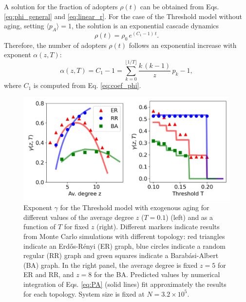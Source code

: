 A solution for the fraction of adopters $\rho(t)$ can be obtained from  Eqs. \eqref{eq:phi_general} and \eqref{eq:linear_r}.  For the case of the Threshold model without aging, setting $\langle p_A \rangle = 1$,  the solution is an exponential cascade dynamics
\begin{equation}
    \rho(t) = \rho_0 \, e^{(C_1 - 1)\, t}.
\end{equation}
Therefore, the number of adopters $\rho (t)$ follows an exponential increase with exponent $\alpha(z,T)$:
\begin{equation}
    \label{eq:alpha}
    \alpha(z,T) = C_1 - 1 = \sum_{k=0}^{\lfloor 1/T \rfloor} \frac{k \, (k - 1)}{z}\, p_k - 1,
\end{equation}
where $C_1$ is computed from Eq. \eqref{eq:coef_phi}. 

\begin{figure}
\includegraphics[width=\columnwidth]{Figs/Aging_Threshold/EXO.pdf}
\caption[Exponent $\gamma$ for the Threshold model with exogenous aging]{\label{fig:exo_exp} Exponent $\gamma$ for the Threshold model with exogenous aging for different values of the average degree $z$ ($T = 0.1$) (left) and as a function of  $T$ for fixed $z$ (right). Different markers indicate results from Monte Carlo simulations with different topology: red triangles indicate an Erd\H{o}s-R\'enyi (ER) graph, blue circles indicate a random regular (RR) graph and green squares indicate a Barab\'asi-Albert (BA) graph. In the right panel, the average degree is fixed $z = 5$ for ER and RR, and $z = 8$ for the BA. Predicted values by numerical integration of Eqs. \eqref{eq:PA} (solid lines) fit approximately the results for each topology. System size is fixed at $N = 3.2 \times 10^5$.}
\end{figure}

